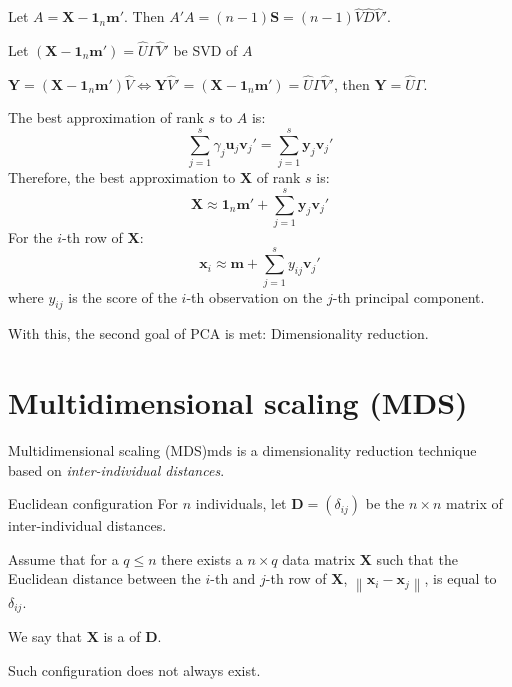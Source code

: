 Let $A = \boldsymbol{X} - \boldsymbol 1_n \boldsymbol m '$. Then $A'A = (n - 1) \boldsymbol{S} =
(n - 1) \hat{V} \hat{D} \hat{V}'$.

Let $(\boldsymbol X - \boldsymbol 1_n \boldsymbol m ') = \hat{U}\Gamma \hat{V}'$ be SVD of $A$

$\boldsymbol{Y} = (\boldsymbol X - \boldsymbol 1_n \boldsymbol m ') \hat{V} \iff
\boldsymbol Y \hat{V}' = (\boldsymbol X - \boldsymbol 1_n \boldsymbol m ') = \hat{U}\Gamma\hat{V}'$,
then $\boldsymbol{Y} = \hat{U}\Gamma$.

The best approximation of rank $s$ to $A$ is:
\begin{equation*}
    \sum_{j=1}^s \gamma_j \boldsymbol{u}_j \boldsymbol{v}_j' = \sum_{j=1}^s \boldsymbol{y}_j \boldsymbol{v}_j' 
\end{equation*}
Therefore, the best approximation to $\boldsymbol{X}$ of rank $s$ is:
\begin{equation*}
    \boldsymbol{X} \approx \boldsymbol 1_n \boldsymbol m ' + \sum_{j=1}^s \boldsymbol{y}_j \boldsymbol{v}_j'
\end{equation*}
For the $i$-th row of $\boldsymbol{X}$:
\begin{equation*}
    \boldsymbol{x}_i \approx \boldsymbol{m} + \sum_{j=1}^s y_{ij} \boldsymbol{v}_j'
\end{equation*}
where $y_{ij}$ is the score of the $i$-th observation on the $j$-th principal component.

\begin{note}
    With this, the second goal of PCA is met: Dimensionality reduction.
\end{note}

\section{Multidimensional scaling (MDS)}

\begin{definition}{Multidimensional scaling (MDS)}{mds}
    is a dimensionality reduction technique based on \emph{inter-individual distances}.
\end{definition}

\begin{definition}{Euclidean configuration}{}
For $n$ individuals, let $\boldsymbol{D} = (\delta_{ij})$ be the $n \times n$ matrix of inter-individual
distances.

Assume that for a $q \leq n$ there exists a $n \times q$ data matrix $\boldsymbol{X}$ such that
the Euclidean distance between the $i$-th and $j$-th row of $\boldsymbol{X}$,
$\left\lVert \boldsymbol{x}_i - \boldsymbol{x}_j \right\rVert$, is equal to $\delta_{ij}$.

We say that $\boldsymbol{X}$ is a  of $\boldsymbol{D}$.
\tcblower
\begin{note}
    Such configuration does not always exist.
\end{note}
\end{definition}

